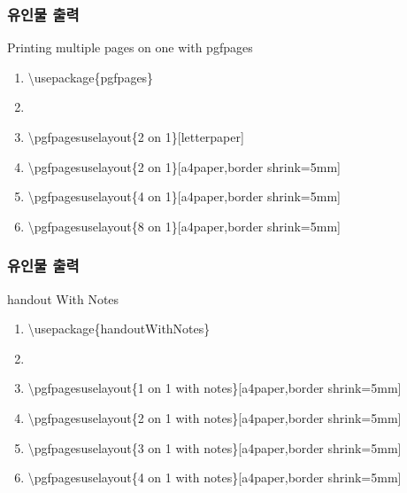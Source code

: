 \documentclass[10pt,blue,xcolor=pdftex,dvipsnames,table,handout]{beamer}
\begin{document}
		\begin{frame}[t]
		\frametitle{유인물 출력}

			\begin{block} {Printing multiple pages on one with pgfpages}
			\begin{enumerate}
			\item[]	\textbackslash usepackage\{pgfpages\}
			\item[]	
			\item[]	\textbackslash pgfpagesuselayout\{2 on 1\}[letterpaper]
			\item[]	\textbackslash pgfpagesuselayout\{2 on 1\}[a4paper,border shrink=5mm]
			\item[]	\textbackslash pgfpagesuselayout\{4 on 1\}[a4paper,border shrink=5mm]
			\item[]	\textbackslash pgfpagesuselayout\{8 on 1\}[a4paper,border shrink=5mm]

			\end{enumerate}
			\end{block}
		\end{frame}


		\begin{frame}[t,shrink=10]
		\frametitle{유인물 출력}

			\begin{block} {handout With Notes}
			\begin{enumerate}
			\item[]	\textbackslash usepackage\{handoutWithNotes\}
			\item[]	
			\item[]	\textbackslash pgfpagesuselayout\{1 on 1 with notes\}[a4paper,border shrink=5mm]
			\item[]	\textbackslash pgfpagesuselayout\{2 on 1 with notes\}[a4paper,border shrink=5mm]
			\item[]	\textbackslash pgfpagesuselayout\{3 on 1 with notes\}[a4paper,border shrink=5mm]
			\item[]	\textbackslash pgfpagesuselayout\{4 on 1 with notes\}[a4paper,border shrink=5mm]

			\end{enumerate}
			\end{block}
		\end{frame}
\end{document}
